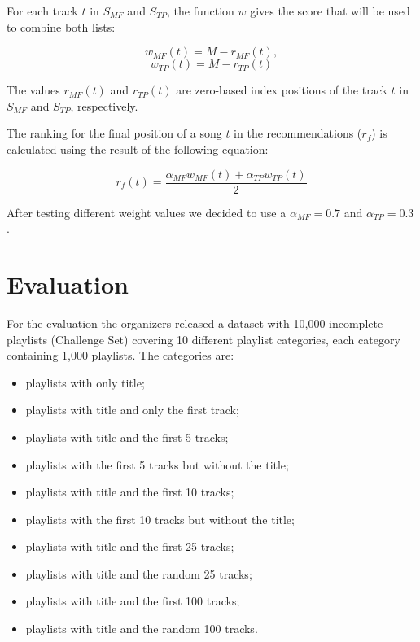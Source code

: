 For each track $t$ in $S_{MF}$ and $S_{TP}$, the function $w$ gives the score that will be used to combine both lists:

\begin{displaymath}
  w_{MF}(t)=M - r_{MF}(t),
\end{displaymath}
\begin{displaymath}
  w_{TP}(t)=M - r_{TP}(t)
\end{displaymath}

The values $r_{MF}(t)$ and $r_{TP}(t)$ are zero-based index positions  of the track $t$ in $S_{MF}$ and $S_{TP}$, respectively.

The ranking for the final position of a song $t$ in the recommendations ($r_{f}$) is calculated using the result of the following equation: 


\begin{displaymath}
  r_{f}(t)=\frac{\alpha_{MF} w_{MF}(t) +\alpha_{TP} w_{TP}(t)}{2} 
\end{displaymath}


After testing different weight values we decided to use a $\alpha_{MF}=0.7$ and $\alpha_{TP}=0.3$.

\section{Evaluation}

For the evaluation the organizers released a dataset with 10,000 incomplete playlists (Challenge Set) covering 10 different playlist categories, each category containing 1,000 playlists. The categories are:
\begin{itemize}
\item playlists with only title;
\item playlists with title and only the first track;
\item playlists with title and the first 5 tracks;
\item playlists with the first 5 tracks but without the title;
\item playlists with title and the first 10 tracks;
\item playlists with the first 10 tracks but without the title;
\item playlists with title and the first 25 tracks;
\item playlists with title and the random 25 tracks;
\item playlists with title and the first 100 tracks;
\item playlists with title and the random 100 tracks.
\end{itemize}

